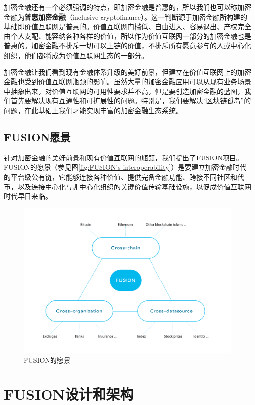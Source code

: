\documentclass[a4paper,12pt]{article}
\begin{document}
加密金融还有一个必须强调的特点，即加密金融是普惠的，所以我们也可以称加密金融为\textbf{普惠加密金融}（inclusive cryptofinance）。这一判断源于加密金融所构建的基础即价值互联网是普惠的。价值互联网门槛低、自由进入、容易退出、产权完全由个人支配、能容纳各种各样的价值，所以作为价值互联网一部分的加密金融也是普惠的。加密金融不排斥一切可以上链的价值，不排斥所有愿意参与的人或中心化组织，他们都将成为价值互联网生态的一部分。

加密金融让我们看到现有金融体系升级的美好前景，但建立在价值互联网上的加密金融也受到价值互联网瓶颈的影响。虽然大量的加密金融应用可以从现有业务场景中抽象出来，对价值互联网的可用性要求并不高，但是要创造加密金融的蓝图，我们首先要解决现有互通性和可扩展性的问题。特别是，我们要解决“区块链孤岛”的问题，在此基础上我们才能实现丰富的加密金融生态系统。

\subsection{FUSION愿景}

针对加密金融的美好前景和现有价值互联网的瓶颈，我们提出了FUSION项目。FUSION的愿景（参见图\ref{fig:FUSION's-interoperability}）是要建立加密金融时代的平台级公有链，它能够连接各种价值、提供完备金融功能、跨接不同社区和代币，以及连接中心化与非中心化组织的关键价值传输基础设施，以促成价值互联网时代早日来临。


\begin {figure} [htbp]
\centering \includegraphics [width = 5in] {pic_cn/FUSION's-interoperability.png}
\caption {FUSION的愿景} \label {fig: FUSION's-interoperability}
\end {figure}


\section{FUSION设计和架构}
\end{document}
